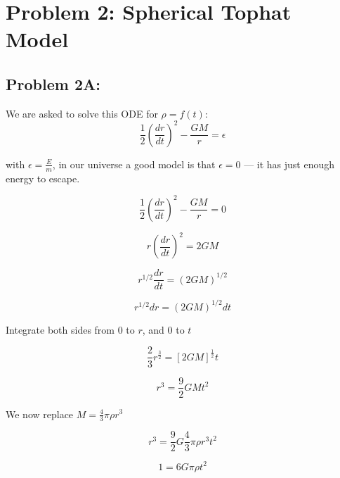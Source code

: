 
\section{Problem 2: Spherical Tophat Model}

\subsection*{Problem 2A:}

We are asked to solve this ODE for $\rho = f(t)$:
\begin{equation}
    \frac{1}{2}(\frac{dr}{dt})^2  - \frac{GM}{r} = \epsilon
\end{equation}

with $\epsilon = \frac{E}{m}$, in our universe a good model is that $\epsilon = 0$ --- it has just enough energy to escape. 


\begin{equation}
    \frac{1}{2}(\frac{dr}{dt})^2  - \frac{GM}{r} = 0
\end{equation}


\begin{equation}
   r (\frac{dr}{dt})^2=  2GM 
\end{equation}


\begin{equation}
   r^{1/2} \frac{dr}{dt} = (2GM)^{1/2} 
\end{equation}

\begin{equation}
   r^{1/2} dr = (2GM)^{1/2} dt
\end{equation}

Integrate both sides from $0$ to $r$, and $0$ to $t$

\begin{equation}
  \frac{2}{3} r ^{\frac{3}{2}} = [2GM]^{\frac{1}{2}}t
\end{equation}

\begin{equation}
  r^3 =  \frac{9}{2} GMt^2
\end{equation}

We now replace $M = \frac{4}{3} \pi \rho r^3$

\begin{equation}
  r^3 =  \frac{9}{2} G\frac{4}{3} \pi \rho r^3t^2
\end{equation}

\begin{equation}
  1 =  6 G \pi \rho t^2
\end{equation}


